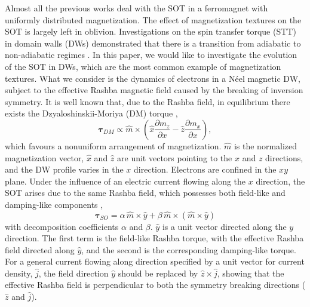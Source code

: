\documentclass[12pt]{iopart}
\begin{document}
Almost all the previous works deal with the SOT in a ferromagnet with uniformly distributed magnetization. The effect of magnetization textures on the SOT is largely left in oblivion. Investigations on the spin transfer torque \cite{Berger96,Slonczewski96,Li04,Thiaville05} (STT) in domain walls (DWs) demonstrated that there is a transition from adiabatic to non-adiabatic regimes \cite{Xiao06}. In this paper, we would like to investigate the evolution of the SOT in DWs, which are the most common example of magnetization textures. What we consider is the dynamics of electrons in a N\'{e}el magnetic DW, subject to the effective Rashba magnetic field caused by the breaking of inversion symmetry. It is well known that, due to the Rashba field, in equilibrium there exists the Dzyaloshinskii-Moriya \cite{Dzyaloshinskii,Moriya} (DM) torque \cite{Bogdanov89,Bogdanov94,DMfield},
\begin{equation}
\bm{\tau}_ {DM} \propto \hat{m} \times \left( \hat{x} \frac {\partial m_z} {\partial x} - \hat{z} \frac {\partial m_x} {\partial x} \right),
\label{dmtorque}
\end{equation}
which favours a nonuniform arrangement of magnetization. $\hat{m}$ is the normalized magnetization vector, $\hat {x}$ and $\hat {z}$ are unit vectors pointing to the $x$ and $z$ directions, and the DW profile varies in the $x$ direction. Electrons are confined in the $xy$ plane. Under the influence of an electric current flowing along the $x$ direction, the SOT arises due to the same Rashba field, which possesses both field-like and damping-like components \cite{Wang12,kim13},
\begin{equation}
\bm {\tau}_{SO} = \alpha\, \hat {m} \times \hat{y} + \beta\, \hat {m} \times (\hat {m} \times \hat{y})
\label{sotorque}
\end{equation}
with decomposition coefficients $\alpha$ and $\beta$. $\hat {y}$ is a unit vector directed along the $y$ direction. The first term is the field-like Rashba torque, with the effective Rashba field directed along $\hat{y}$, and the second is the corresponding damping-like torque. For a general current flowing along direction specified by a unit vector for current density, $\hat {j}$, the field direction $\hat {y}$ should be replaced by $\hat{z} \times \hat{j}$, showing that the effective Rashba field is perpendicular to both the symmetry breaking directions ($\hat {z}$ and $\hat {j}$).
\end{document}
